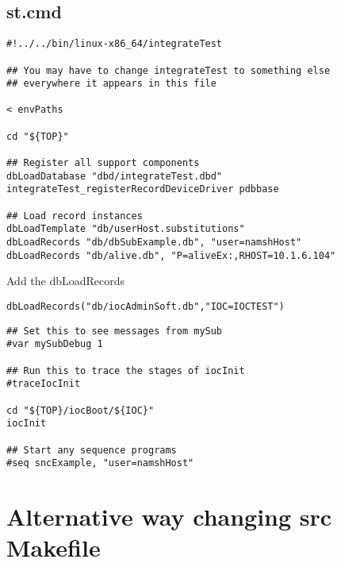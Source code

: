 \documentclass[11pt
  , a4paper
  , article
  , oneside
]{memoir}
\begin{document}
\subsection{st.cmd}
\begin{lstlisting}[style=termstyle]
#!../../bin/linux-x86_64/integrateTest

## You may have to change integrateTest to something else
## everywhere it appears in this file

< envPaths

cd "${TOP}"

## Register all support components
dbLoadDatabase "dbd/integrateTest.dbd"
integrateTest_registerRecordDeviceDriver pdbbase

## Load record instances
dbLoadTemplate "db/userHost.substitutions"
dbLoadRecords "db/dbSubExample.db", "user=namshHost"
dbLoadRecords "db/alive.db", "P=aliveEx:,RHOST=10.1.6.104"
\end{lstlisting}
Add the dbLoadRecords
\begin{lstlisting}[style=termstyle]
dbLoadRecords("db/iocAdminSoft.db","IOC=IOCTEST")
\end{lstlisting}
\begin{lstlisting}[style=termstyle]
## Set this to see messages from mySub
#var mySubDebug 1

## Run this to trace the stages of iocInit
#traceIocInit

cd "${TOP}/iocBoot/${IOC}"
iocInit

## Start any sequence programs
#seq sncExample, "user=namshHost"

\end{lstlisting}
\section{Alternative way changing src Makefile}
\end{document}
